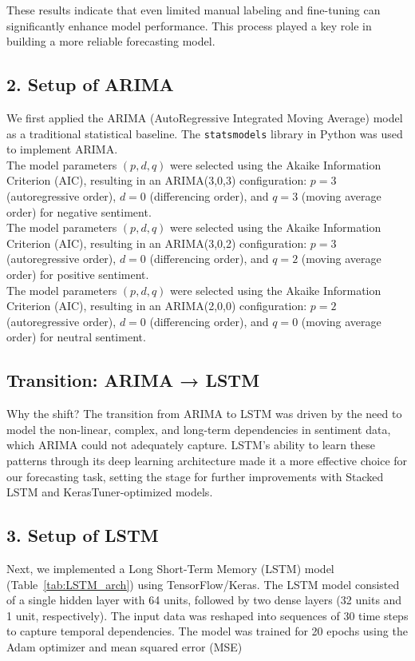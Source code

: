 \documentclass[letterpaper]{article}
\begin{document}
These results indicate that even limited manual labeling and fine-tuning can significantly enhance model performance. This process played a key role in building a more reliable forecasting model.

\subsection{2. Setup of ARIMA}
We first applied the ARIMA (AutoRegressive Integrated Moving Average) model as a traditional statistical baseline. The \texttt{statsmodels} library in Python was used to implement ARIMA.\\
The model parameters $(p, d, q)$ were selected using the Akaike Information Criterion (AIC), resulting in an ARIMA(3,0,3) configuration: $p=3$ (autoregressive order), $d=0$ (differencing order), and $q=3$ (moving average order) for negative sentiment.\\
The model parameters $(p, d, q)$ were selected using the Akaike Information Criterion (AIC), resulting in an ARIMA(3,0,2) configuration: $p=3$ (autoregressive order), $d=0$ (differencing order), and $q=2$ (moving average order) for positive sentiment.\\
The model parameters $(p, d, q)$ were selected using the Akaike Information Criterion (AIC), resulting in an ARIMA(2,0,0) configuration: $p=2$ (autoregressive order), $d=0$ (differencing order), and $q=0$ (moving average order) for neutral sentiment.

\subsection{Transition: ARIMA → LSTM}
Why the shift?
The transition from ARIMA to LSTM was driven by the need to model the non-linear, complex, and long-term dependencies in sentiment data, which ARIMA could not adequately capture. LSTM's ability to learn these patterns through its deep learning architecture made it a more effective choice for our forecasting task, setting the stage for further improvements with Stacked LSTM and KerasTuner-optimized models.

\subsection{3. Setup of LSTM}
Next, we implemented a Long Short-Term Memory (LSTM) model (Table~\ref{tab:LSTM_arch}) using TensorFlow/Keras. The LSTM model consisted of a single hidden layer with 64 units, followed by two dense layers (32 units and 1 unit, respectively). The input data was reshaped into sequences of 30 time steps to capture temporal dependencies. The model was trained for 20 epochs using the Adam optimizer and mean squared error (MSE)
\end{document}
